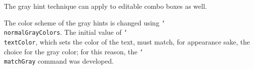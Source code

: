 \documentclass{article}
\def\cs#1{\texttt{\char`\\#1}}
\begin{document}
The gray hint technique can apply to editable combo boxes as well.\vcgBdry[3bp]
\cgBdry[1em]
\vcgBdry[6bp]

The color scheme of the gray hints is changed using
\cs{normalGrayColors}. The initial value of \cs{textColor}, which sets the
color of the text, must match, for appearance sake, the choice for the gray
color; for this reason, the \cs{matchGray} command was developed.\vcgBdry[6bp]


\end{document}
